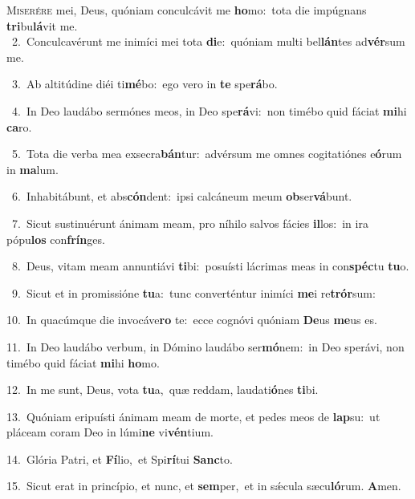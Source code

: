 \lettrine{\initial\textcolor{\initialcolor}{M}}{iserére} mei, Deus, quóniam conculcávit me \textbf{ho}\-mo:~\star tota die impúgnans \textbf{tri}\-bu\-\textbf{lá}\-vit me.\\
{\numbfont\textcolor{\numbcolor}{~2.}}~Conculcavérunt me inimíci mei tota \textbf{di}\-e:~\star quóniam multi bel\-\textbf{lán}\-tes ad\-\textbf{vér}\-sum me.\par
{\numbfont\textcolor{\numbcolor}{~3.}}~Ab altitúdine diéi ti\-\textbf{mé}\-bo:~\star ego vero in \textbf{te} spe\-\textbf{rá}\-bo.\par
{\numbfont\textcolor{\numbcolor}{~4.}}~In Deo laudábo sermónes meos, in Deo spe\-\textbf{rá}\-vi:~\star non timébo quid fáciat \textbf{mi}\-hi \textbf{ca}\-ro.\par
{\numbfont\textcolor{\numbcolor}{~5.}}~Tota die verba mea exsecra\-\textbf{bán}\-tur:~\star advérsum me omnes cogitatiónes e\-\textbf{ó}\-rum in \textbf{ma}\-lum.\par
{\numbfont\textcolor{\numbcolor}{~6.}}~Inhabitábunt, et abs\-\textbf{cón}\-dent:~\star ipsi calcáneum meum \textbf{ob}\-ser\-\textbf{vá}\-bunt.\par
{\numbfont\textcolor{\numbcolor}{~7.}}~Sicut sustinuérunt ánimam meam, pro níhilo salvos fácies \textbf{il}\-los:~\star in ira pópu\textbf{los} con\-\textbf{frín}\-ges.\par
{\numbfont\textcolor{\numbcolor}{~8.}}~Deus, vitam meam annuntiávi \textbf{ti}\-bi:~\star posuísti lácrimas meas in con\-\textbf{spéc}\-tu \textbf{tu}\-o.\par
{\numbfont\textcolor{\numbcolor}{~9.}}~Sicut et in promissióne \textbf{tu}\-a:~\star tunc converténtur inimíci \textbf{me}\-i re\-\textbf{trór}\-sum:\par
{\numbfont\textcolor{\numbcolor}{10.}}~In quacúmque die invocáve\textbf{ro} te:~\star ecce cognóvi quóniam \textbf{De}\-us \textbf{me}\-us es.\par
{\numbfont\textcolor{\numbcolor}{11.}}~In Deo laudábo verbum, in Dómino laudábo ser\-\textbf{mó}\-nem:~\star in Deo sperávi, non timébo quid fáciat \textbf{mi}\-hi \textbf{ho}\-mo.\par
{\numbfont\textcolor{\numbcolor}{12.}}~In me sunt, Deus, vota \textbf{tu}\-a,~\star quæ reddam, laudati\-\textbf{ó}\-nes \textbf{ti}\-bi.\par
{\numbfont\textcolor{\numbcolor}{13.}}~Quóniam eripuísti ánimam meam de morte, et pedes meos de \textbf{lap}\-su:~\star ut pláceam coram Deo in lúmi\textbf{ne} vi\-\textbf{vén}\-tium.\par
{\numbfont\textcolor{\numbcolor}{14.}}~Glória Patri, et \textbf{Fí}\-lio,~\star et Spi\-\textbf{rí}\-tui \textbf{Sanc}\-to.\par
{\numbfont\textcolor{\numbcolor}{15.}}~Sicut erat in princípio, et nunc, et \textbf{sem}\-per,~\star et in sǽcula sæcu\-\textbf{ló}\-rum. \textbf{A}\-men.\par
